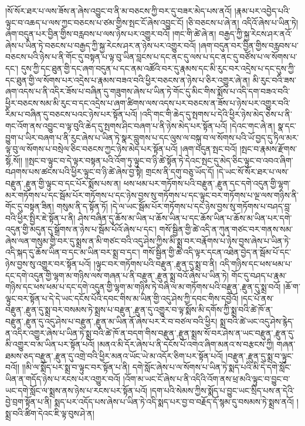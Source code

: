 །སོ་སོར་ཐར་པ་ལས་ཟོས་ན་ཞེས་འབྱུང་བ་ནི་མ་བཅངས་ཀྱི་བར་དུ་བཟར་མེད་པས་ནའོ། །རྣམ་པར་འབྱེད་པའི་ལྟུང་བ་འཆད་པ་ལས་ཀྱང་བཅངས་པ་ཙམ་གྱིས་སྤང་ངོ་ཞེས་འབྱུང་ངོ། །ཅི་བཅངས་པ་ཞེ་ན། འདིའོ་ཞེས་པ་ཡིན་ཏེ། ཞག་བདུན་པར་བྱིན་གྱིས་བརླབས་པ་ལས་ཉེས་པར་འགྱུར་བའོ། །གང་གི་ཚེ་ཞེ་ན། བརྒྱད་ཀྱི་སྐྱ་རེངས་ཤར་ནའོ་ཞེས་པ་ཡིན་ཏེ་བཅངས་པ་བརྒྱད་ཀྱི་སྐྱ་རེངས་ཤར་ན་ཉེས་པར་འགྱུར་བའོ། །ཞག་བདུན་བར་བྱིན་གྱིས་བརླབས་པ་བཅངས་པའི་ཉེས་པ་ནི་གོང་དུ་བསྟན་པ་ལྟ་བུ་ཡིན་བླངས་པ་དང་ནང་དུ་ལས་པ་དང་ནང་དུ་བཙོས་པ་ལ་སོགས་པ་དང་། དུས་ཀྱི་དང་ཐུན་གྱི་དང་ཞག་བདུན་པ་དང་ནམ་འཚོའི་བར་དུ་རྣམས་དང་མི་རུང་བར་འདྲེས་པ་དང་དུས་ཀྱི་དང་ཐུན་གྱི་ལ་སོགས་པར་འདྲེས་པ་རྣམས་བཟའ་བའི་ཕྱིར་བཅངས་ན་ཉེས་པ་ཅིར་འགྱུར་ཞེ་ན། མི་རུང་བའི་ཟས་ཞག་འདས་པ་ནི་འདིར་ཟོས་པ་བཞིན་དུ་གཟུགས་ཞེས་པ་ཡིན་ཏེ་གོང་དུ་མིང་གིས་སྨོས་པ་འདི་དག་བཟའ་བའི་ཕྱིར་བཅངས་སམ་མི་རུང་བ་དང་འདྲེས་པ་ཞག་ཚིགས་ལས་འདས་པར་བཅངས་ན་ཟོས་པ་ཉེས་པར་འགྱུར་བའི་རིམ་པ་བཞིན་དུ་བཅངས་པའང་ཉེས་པར་སྟོན་པའོ། །འདི་གང་གི་ཆེད་དུ་སྤགས་པ་དེའི་ཕྱིར་ཉེས་མེད་ཅེས་པ་ནི་གང་འོག་ནས་འབྱུང་བ་ལྟ་བུའི་ཆེད་དུ་སྤགས་ཤིང་བཞག་པ་ནི་ཉེས་མེད་པར་སྟོན་པའོ། །དེའང་གང་ཞེ་ན། སྣ་དང་བྱུག་པ་ཡིར་བཞག་པ་ནི་རུང་ཞེས་པ་ཡིན་ཏེ་སྣར་བླུགས་པ་དང་ལུས་ལ་བསྐུ་བ་ལ་སོགས་པའི་ཡོ་བྱད་དུ་ཏིལ་མར་ལྟ་བུ་ལ་སོགས་པ་བསྲེལ་ཅིང་བཅངས་ཀྱང་ཉེས་མེད་པར་སྟོན་པའོ། །ཞག་བདུན་སྤང་བའོ། །སྤང་བ་རྣམས་རྫོགས་{སྷོ,སོ}།། །།སྤང་བ་ལྟུང་བ་དེ་ལྟར་བསྟན་པའི་འོག་ཏུ་ལྟུང་བ་ཉི་ཚེ་སྟོན་ཏེ་དེའང་སྤང་དུ་མེད་ཅིང་ལྟུང་བ་འབའ་ཞིག་བཤགས་པས་ཚངས་པའི་ཕྱིར་ལྟུང་བ་ཉི་ཚེ་ཞེས་བྱ་སྟེ། གྲངས་ནི་དགུ་བཅུ་ཡོད་དོ། །དེ་ཡང་སོ་སོར་ཐར་པ་ལས་{བརྫུན་,རྫུན་}གྱི་ལྟུང་བ་དང་པོར་སྨོས་པས་ན། ཕས་ཕམ་པར་གཏོགས་པའི་{བརྫུན་,རྫུན་}དང་དགེ་འདུན་གྱི་ལྷག་མར་གཏོགས་པ་དང་སྦོམ་པོར་གཏོགས་པ་དང་ཉེས་བྱས་སུ་གཏོགས་པ་དང་ལྟུང་བར་གཏོགས་པ་ལྔ་ལས་གཉིས་ནི་གོང་དུ་བསྟན་ཟིན། གསུམ་ནི་ད་སྟོན་ཏོ། །དེ་ལ་ཡང་སྦོམ་པོར་གཏོགས་པ་དང་ཉེས་བྱས་སུ་གཏོགས་པ་བཤད་བླ་བའི་ཕྱིར་སྤྱིར་ཇེ་སྟོན་པ་ནི། ཤེས་བཞིན་དུ་ཆོས་མ་ཡིན་པ་ཆོས་ཡིན་པ་དང་ཆོས་ཡིན་པ་ཆོས་མ་ཡིན་པར་དགེ་འདུན་གྱི་མདུན་དུ་སྒྲོགས་ན་ཉེས་པ་སྦོམ་པོའོ་ཞེས་པ་དང་། གསོ་སྦྱིན་གྱི་ཚེ་འདི་ན་ཀུན་གཙང་བར་གནས་སམ་ཞེས་ལན་གསུམ་གྱི་བར་དུ་སྨྲས་ན་མི་གཙང་བའི་འདུ་ཤེས་ཀྱིས་མི་སྨྲ་བར་བརྣོགས་པ་ཉེས་བྱས་ཞེས་པ་ཡིན་ཏེ་འདི་སྐད་དུ་ཆོས་ཡིན་བ་དང་མ་ཡིན་བར་སྨྲ་བ་དང་། གསོ་སྦྱིན་གྱི་ཚེ་འདི་ལྟར་དངན་འཐེན་བྱེད་ན་སྦོམ་པོ་དང་ཉེས་བྱས་སུ་འགྱུར་བར་སྟོན་པའོ། །ལྟུང་བར་གཏོགས་པའི་{བརྫུན་,རྫུན་}དུ་སྨྲ་བ་ནི། འདི་གཉིས་དང་ཕས་ཕམ་པ་དང་དགེ་འདུན་གྱི་ལྷག་མ་གཉིས་ལས་གཞན་པ་ནི་{བརྫུན་,རྫུན་}སྨྲ་བའོ་ཞེས་པ་ཡིན་ཏེ། གོང་དུ་བཤད་པ་རྣམ་གཉིས་དང་ཕས་ཕམ་པ་དང་དགེ་འདུན་གྱི་ལྷག་མ་གཉིས་ཏེ་བཞི་ལ་མ་གཏོགས་པའི་{བརྫུན་,རྫུན་}དུ་སྨྲ་བའོ། །ཆོ་ག་ལྟུང་བར་སྟོན་པ་དེ་དེ་ཡང་དངོས་པོའི་དབང་གིས་མ་ཡིན་གྱི་འདུ་ཤེས་ཀྱི་དབང་གིས་དབྱེའོ། །དང་པོ་ནས་{བརྫུན་,རྫུན་}དུ་སྨྲ་བར་བསམས་ཏེ་སྨྲས་པ་{བརྫུན་,རྫུན་}དུ་འགྱུར་བ་ལྟ་སྨོས་མི་དགོས་ཀྱི་སྨྲ་བའི་ཚེ་ཁོ་ན་{བརྫུན་,རྫུན་}དུ་འདུ་ཤེས་པ་{བརྫུན་,རྫུན་}མ་ཡིན་ནོ་ཞེས་པར་རེ་བ་བཙལ་བའི་ཕྱིར། སྨྲ་བའི་ཚེ་ཡང་འདུ་ཤེས་རྙེད་ན་འདིར་འགྱུར་ཞེས་པ་ཡིན་ཏེ་སྨྲ་བའི་ཚེ་ཁོ་ན་བདག་གིས་{བརྫུན་,རྫུན་}སྨྲས་སོ་བར་ཤེས་ན་ཡང་{བརྫུན་,རྫུན་}དུ་མི་འགྱུར་བ་མ་ཡིན་པར་སྟོན་པའོ། །མནའ་མི་དོར་ཞེས་པ་ནི་དངོས་པོ་འགའ་ཞིག་མནའ་ས་བརྩངས་ཀྱི། གཞན་ཐམས་ཅད་{བརྫུན་,རྫུན་}དུ་འགྲེ་བའི་ཕྱིར་མནའ་ཡོང་ཡེ་མ་འདོར་ཅིག་པར་སྟོན་པའོ། །{བརྫུན་,རྫུན་}དུ་སྨྲ་བ་ལྟུང་བའོ།། །།མི་ལ་སྨོད་པར་སྨྲ་བ་ལྟུང་བར་སྟོན་པ་ནི། དགེ་སློང་ཞེས་པ་ལ་སོགས་པ་ཡིན་ཏེ་སྨད་པའི་མི་དེ་དགེ་སློང་ཡིན་ན་གདོད་ཉེས་པ་རངས་པར་འགྱུར་བའོ། །འོག་མ་ཡང་ངོ་ཞེས་པ་ནི་འདིའི་འོག་ནས་ཕྲ་མའི་ལྟུང་བ་བྱུང་བ་ཡང་དགེ་སློང་ལ་སྨྲས་ནས་ཉེས་པ་རངས་པར་སྟོན་པའོ། །དག་པའི་སེམས་ཀྱིས་སྨོད་པ་བྱུང་ཡང་སྲིད་པས་ན་དེའི་བྱེ་བྲག་སྟོན་པ་ནི། སྨད་པར་འདོད་པས་ཞེས་པ་ཡིན་ཏེ་འདི་སྨད་པར་བྱ་བ་བརྗོད་དོ་སྙམ་དུ་བསམས་ཏེ་སྨྲས་ནའོ། །སྨྲ་བའི་ཚིག་དེའང་ཇི་ལྟ་བུས་ཤེ་ན། 
